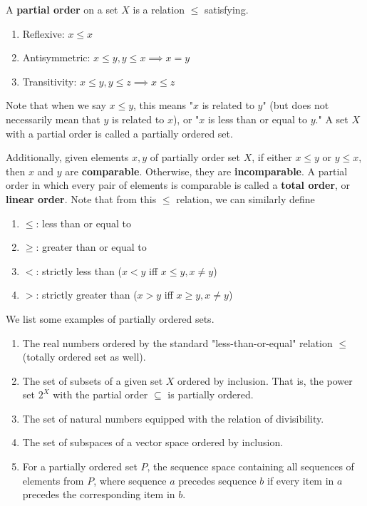     \begin{definition}
      A \textbf{partial order} on a set $X$ is a relation $\leq$ satisfying. 
      \begin{enumerate}
        \item Reflexive: $x \leq x$ 
        \item Antisymmetric: $x \leq y, y \leq x \implies x = y$
        \item Transitivity: $x \leq y, y \leq z \implies x \leq z$
      \end{enumerate}
      Note that when we say $x \leq y$, this means "$x$ is related to $y$" (but does not necessarily mean that $y$ is related to $x$), or "$x$ is less than or equal to $y$." A set $X$ with a partial order is called a partially ordered set. 

      Additionally, given elements $x, y$ of partially order set $X$, if either $x \leq y$ or $y \leq x$, then $x$ and $y$ are \textbf{comparable}. Otherwise, they are \textbf{incomparable}. A partial order in which every pair of elements is comparable is called a \textbf{total order}, or \textbf{linear order}. Note that from this $\leq$ relation, we can similarly define 
      \begin{enumerate}
        \item $\leq$: less than or equal to 
        \item $\geq$: greater than or equal to 
        \item $<$: strictly less than ($x < y$ iff $x\leq y, x \neq y$)
        \item $>$: strictly greater than ($x > y$ iff $x \geq y, x \neq y$)
      \end{enumerate}
    \end{definition} 

    \begin{example}
      We list some examples of partially ordered sets. 
      \begin{enumerate}
        \item The real numbers ordered by the standard "less-than-or-equal" relation $\leq$ (totally ordered set as well). 
        \item The set of subsets of a given set $X$ ordered by inclusion. That is, the power set $2^X$ with the partial order $\subseteq$ is partially ordered. 
        \item The set of natural numbers equipped with the relation of divisibility. 
        \item The set of subspaces of a vector space ordered by inclusion. 
        \item For a partially ordered set $P$, the sequence space containing all sequences of elements from $P$, where sequence $a$ precedes sequence $b$ if every item in $a$ precedes the corresponding item in $b$. 
      \end{enumerate}
    \end{example} 

